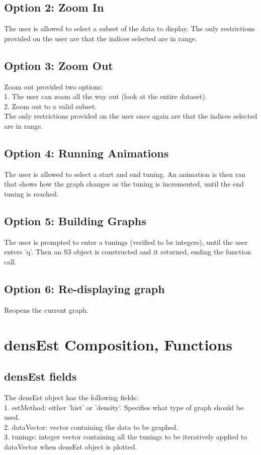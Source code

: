 \documentclass{article}
\begin{document}
\subsection{Option 2: Zoom In}
The user is allowed to select a subset of the data to display. The only restrictions provided on the user are that the indices selected are in range.

\subsection{Option 3: Zoom Out}
Zoom out provided two options: \\
1. The user can zoom all the way out (look at the entire dataset).\\
2. Zoom out to a valid subset.  \\

The only restrictions provided on the user once again are that the indices selected are in range.

\subsection{Option 4: Running Animations}
The user is allowed to select a start and end tuning. An animation is then ran that shows how the graph changes as the tuning is incremented, until the end tuning is reached.

\subsection{Option 5: Building Graphs}
The user is prompted to enter a tunings (verified to be integers), until the user enters 'q'. Then an S3 object is constructed and it returned, ending the function call.

\subsection{Option 6: Re-displaying graph}
Reopens the current graph.

\section{densEst Composition, Functions}
\subsection{densEst fields}
The densEst object has the following fields:\\
1. estMethod: either 'hist' or 'density'. Specifies what type of graph should be used.\\
2. dataVector: vector containing the data to be graphed. \\
3. tunings: integer vector containing all the tunings to be iteratively applied to dataVector when densEst object is plotted. 
\end{document}
